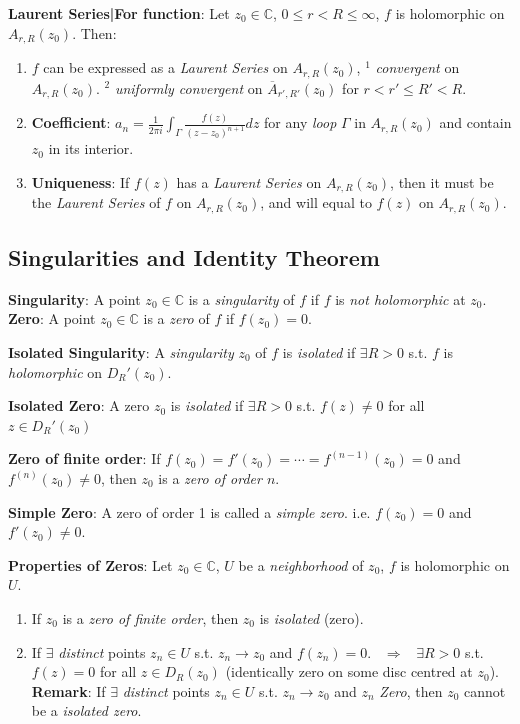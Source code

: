 \documentclass[9pt]{article}
\begin{document}
\textbf{Laurent Series|For function}: Let $z_0\in\mathbb{C}$, $0\leq r<R\leq\infty$, $f$ is holomorphic on $A_{r,R}(z_0)$. Then:

\begin{enumerate}[itemsep=-2pt, topsep=-2pt]
    \item {\footnotesize $f$ can be expressed as a \textit{Laurent Series} on $A_{r,R}(z_0)$,} $^1$ \textit{convergent} on $A_{r,R}(z_0)$. $^2$ \textit{uniformly convergent} on $\overline{A}_{r',R'}(z_0)$ for $r<r'\leq R'<R$.
    \item \textbf{Coefficient}: $a_n=\frac{1}{2\pi i}\int_{\Gamma}\frac{f(z)}{(z-z_0)^{n+1}}dz$ for any \textit{loop} $\Gamma$ in $A_{r,R}(z_0)$ and contain $z_0$ in its interior.
    \item \textbf{Uniqueness}: {\footnotesize If $f(z)$ has a \textit{Laurent Series} on $A_{r,R}(z_0)$, then it must be the \textit{Laurent Series} of $f$ on $A_{r,R}(z_0)$, and will equal to $f(z)$ on $A_{r,R}(z_0)$.}
\end{enumerate}


\subsection{Singularities and Identity Theorem} %

\textbf{Singularity}: {\small A point $z_0\in\mathbb{C}$ is a \textit{singularity} of $f$ if $f$ is \textit{not holomorphic} at $z_0$.} \qquad \textbf{Zero}: {\small A point $z_0\in\mathbb{C}$ is a \textit{zero} of $f$ if $f(z_0)=0$.}

\textbf{Isolated Singularity}: {\small A \textit{singularity} $z_0$ of $f$ is \textit{isolated} if $\exists R>0$ s.t. $f$ is \textit{holomorphic} on $D_{R}'(z_0)$.}

\textbf{Isolated Zero}: {\small A zero $z_0$ is \textit{isolated} if $\exists R>0$ s.t. $f(z)\ne 0$ for all $z\in D_{R}'(z_0)$}

\textbf{Zero of finite order}: {\small If $f(z_0)=f'(z_0)=\cdots=f^{(n-1)}(z_0)=0$ and $f^{(n)}(z_0)\ne 0$, then $z_0$ is a \textit{zero of order $n$}.}

\textbf{Simple Zero}: {\small A zero of order 1 is called a \textit{simple zero}. {\scriptsize i.e. $f(z_0)=0$ and $f'(z_0)\ne 0$.}}

\textbf{Properties of Zeros}: Let $z_0\in\mathbb{C}$, $U$ be a \textit{neighborhood} of $z_0$, $f$ is holomorphic on $U$.

\begin{enumerate}[itemsep=-2pt, topsep=-2pt]
    \item If $z_0$ is a \textit{zero of finite order}, then $z_0$ is \textit{isolated} {\footnotesize (zero)}.
    \item If $\exists$ \textit{distinct} points $z_n\in U$ s.t. $z_n\to z_0$ and $f(z_n)=0$. \ $\Rightarrow$ \ $\exists R>0$ s.t. $f(z)=0$ for all $z\in D_{R}(z_0)$ {\tiny (identically zero on some disc centred at $z_0$)}. \\
    \textbf{Remark}: If $\exists$ \textit{distinct} points $z_n\in U$ s.t. $z_n\to z_0$ and $z_n$ \textit{Zero}, then $z_0$ cannot be a \textit{isolated zero}.
\end{enumerate}
\end{document}
